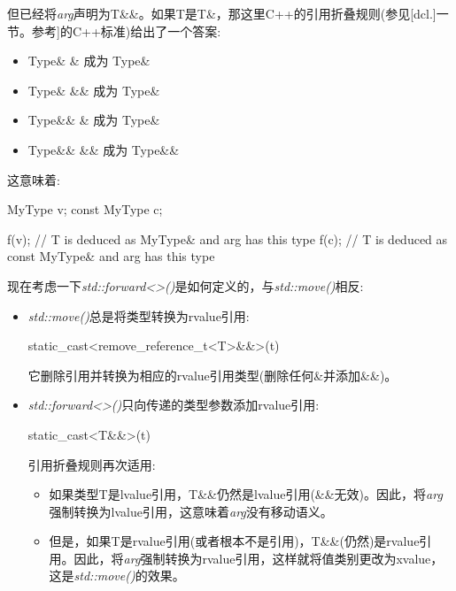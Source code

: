 但已经将\textit{arg}声明为T\&\&。如果T是T\&，那这里C++的引用折叠规则(参见[dcl.]一节。参考]的C++标准)给出了一个答案:\par

\begin{itemize}
  \item Type\& \& 成为 Type\&
  \item Type\& \&\& 成为 Type\&
  \item Type\&\& \& 成为 Type\&
  \item Type\&\& \&\& 成为 Type\&\&
\end{itemize}

这意味着:\par

\begin{codebox}[cpp]
MyType v;
const MyType c;

f(v); // T is deduced as MyType& and arg has this type
f(c); // T is deduced as const MyType& and arg has this type
\end{codebox}

现在考虑一下\textit{std::\allowbreak{}forward<\allowbreak{}>(\allowbreak{})\allowbreak{}}是如何定义的，与\textit{std::move()}相反:\par

\begin{itemize}
  \item \textit{std::move()}总是将类型转换为rvalue引用:
\begin{codebox}[cpp]
  static_cast<remove_reference_t<T>&&>(t)
\end{codebox}
  它删除引用并转换为相应的rvalue引用类型(删除任何\&并添加\&\&)。
  \item \textit{std::\allowbreak{}forward<\allowbreak{}>(\allowbreak{})\allowbreak{}}只向传递的类型参数添加rvalue引用:
\begin{codebox}[cpp]
  static_cast<T&&>(t)
\end{codebox}
  引用折叠规则再次适用:
  \begin{itemize}
    \item[-] 如果类型T是lvalue引用，T\&\&仍然是lvalue引用(\&\&无效)。因此，将\textit{arg}强制转换为lvalue引用，这意味着\textit{arg}没有移动语义。
    \item[-] 但是，如果T是rvalue引用(或者根本不是引用)，T\&\&(仍然)是rvalue引用。因此，将\textit{arg}强制转换为rvalue引用，这样就将值类别更改为xvalue，这是\textit{std::move()}的效果。
  \end{itemize}
\end{itemize}

